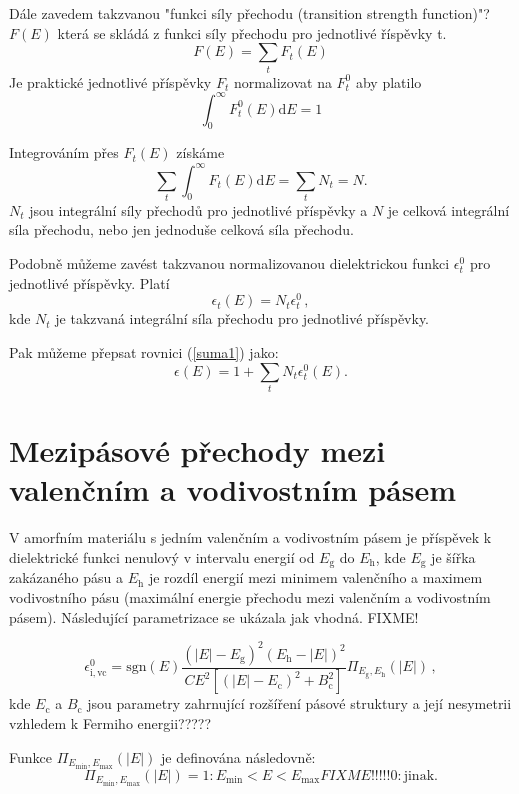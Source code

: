 Dále zavedem takzvanou "funkci síly přechodu (transition strength function)"? $F(E)$ která se skládá z funkci síly přechodu pro jednotlivé říspěvky t.
\begin{equation}
F(E) = \sum_t F_t(E)
\end{equation}
Je praktické jednotlivé příspěvky $F_t$ normalizovat na $F_t^0$ aby platilo
\begin{equation}
\int_0^\infty F_t^0(E)\mathrm{d}E = 1
\end{equation}

Integrováním přes $F_t(E)$ získáme 
\begin{equation}
\sum_t \int_0^\infty F_t(E)\mathrm{d}E = \sum_t N_t = N \mathrm{.}
\end{equation}
$N_t$ jsou integrální síly přechodů pro jednotlivé příspěvky a $N$ je celková integrální síla přechodu, nebo jen jednoduše celková síla přechodu.  

Podobně můžeme zavést takzvanou normalizovanou dielektrickou funkci $\epsilon_t^0$ pro jednotlivé příspěvky. Platí 
\begin{equation}
\epsilon_t(E) = N_t \epsilon_t^0  \, \mathrm{,}
\end{equation}
kde $N_t$ je takzvaná integrální síla přechodu pro jednotlivé příspěvky.

Pak můžeme přepsat rovnici (\ref{suma1}) jako:
\begin{equation}
\epsilon (E) = 1 + \sum_t N_t \epsilon_t^0(E) \mathrm{.}
\end{equation}

\section{Mezipásové přechody mezi valenčním a vodivostním pásem}
V amorfním materiálu s jedním valenčním a vodivostním pásem je příspěvek k dielektrické funkci nenulový v intervalu energií od $E_\mathrm{g}$ do $E_\mathrm{h}$, kde $E_\mathrm{g}$ je šířka zakázaného pásu a $E_\mathrm{h}$ je rozdíl energií mezi minimem valenčního a maximem vodivostního pásu (maximální energie přechodu mezi valenčním a vodivostním pásem). Následující parametrizace se ukázala jak vhodná. FIXME!

\begin{equation}
\epsilon_\mathrm{i,vc}^0 = \mathrm{sgn}(E) \frac{(|E|- E_\mathrm{g})^2(E_\mathrm{h} - |E|)^2}{ C E^2 [(|E| - E_\mathrm{c})^2 + B_\mathrm{c}^2]} \Pi_{E_\mathrm{g},E_\mathrm{h}}(|E|) \, \mathrm{,}
\end{equation}
kde $E_\mathrm{c}$ a $B_\mathrm{c}$ jsou parametry zahrnující rozšíření pásové struktury a její nesymetrii vzhledem k Fermiho energii?????

Funkce $\Pi_{E_\mathrm{min},E_\mathrm{max}}(|E|)$ je definována následovně:
\begin{equation}
\Pi_{E_\mathrm{min},E_\mathrm{max}}(|E|) = 1 : E_\mathrm{min} < E < E_\mathrm{max}
 FIXME!!!!! 0 : \mathrm{jinak.}
\end{equation}




\cleardoublepage
